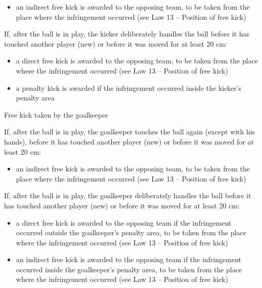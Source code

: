 \begin{itemize}
\item an indirect free kick is awarded to the opposing team, to be taken from the place where the infringement occurred (see Law 13 -- Position of free kick)
\end{itemize}

\bigskip

If, after the ball is in play, the kicker deliberately handles the ball before it has touched another player (new) or before it was moved for at least 20 cm:

\begin{itemize}
\item a direct free kick is awarded to the opposing team, to be taken from the place where the infringement occurred (see Law 13 -- Position of free kick)
\item a penalty kick is awarded if the infringement occurred inside the kicker's penalty area
\end{itemize}

\bigskip

Free kick taken by the goalkeeper

If, after the ball is in play, the goalkeeper touches the ball again (except with his hands), before it has touched another player (new) or before it was moved for at least 20 cm:

\begin{itemize}
\item an indirect free kick is awarded to the opposing team, to be taken from the place where the infringement occurred (see Law 13 -- Position of free kick)
\end{itemize}

\bigskip

If, after the ball is in play, the goalkeeper deliberately handles the ball before it has touched another player (new) or before it was moved for at least 20 cm:

\begin{itemize}
\item a direct free kick is awarded to the opposing team if the infringement occurred outside the goalkeeper's penalty area, to be taken from the place where the infringement occurred (see Law 13 -- Position of free kick)
\item an indirect free kick is awarded to the opposing team if the infringement occurred inside the goalkeeper's penalty area, to be taken from the place where the infringement occurred (see Law 13 -- Position of free kick)
\end{itemize}

